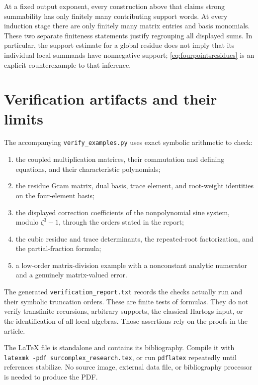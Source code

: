 \documentclass[11pt,oneside]{article}
\numberwithin{equation}{section}
\theoremstyle{definition}
\theoremstyle{remark}\newtheorem{remark}[theorem]{Remark}
\begin{document}
At a fixed output exponent, every construction above that claims strong summability has only finitely many contributing support words. At every induction stage there are only finitely many matrix entries and basis monomials. These two separate finiteness statements justify regrouping all displayed sums. In particular, the support estimate for a global residue does not imply that its individual local summands have nonnegative support; \eqref{eq:fourpointsresidues} is an explicit counterexample to that inference.

\clearpage
\section{Verification artifacts and their limits}\label{app:verification}
The accompanying \texttt{verify\_examples.py} uses exact symbolic arithmetic to check:
\begin{enumerate}
\item the coupled multiplication matrices, their commutation and defining equations, and their characteristic polynomials;
\item the residue Gram matrix, dual basis, trace element, and root-weight identities on the four-element basis;
\item the displayed correction coefficients of the nonpolynomial sine system, modulo \(\zeta^3-1\), through the orders stated in the report;
\item the cubic residue and trace determinants, the repeated-root factorization, and the partial-fraction formula;
\item a low-order matrix-division example with a nonconstant analytic numerator and a genuinely matrix-valued error.
\end{enumerate}
The generated \texttt{verification\_report.txt} records the checks actually run and their symbolic truncation orders. These are finite tests of formulas. They do not verify transfinite recursions, arbitrary supports, the classical Hartogs input, or the identification of all local algebras. Those assertions rely on the proofs in the article.

The LaTeX file is standalone and contains its bibliography. Compile it with \texttt{latexmk -pdf surcomplex\_research.tex}, or run \texttt{pdflatex} repeatedly until references stabilize. No source image, external data file, or bibliography processor is needed to produce the PDF.
\end{document}
